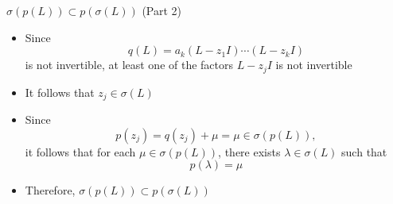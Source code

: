 \documentclass[usenames,dvipsnames,10pt]{beamer}
\begin{document}
\begin{frame}
  {$\sigma(p(L)) \subset p(\sigma(L))$ (Part 2)}

  \begin{itemize}
  \item Since
    \[
      q(L) = a_k(L-z_1I)\cdots(L-z_kI)
    \]
    is not invertible, at least one of the factors $L-z_jI$ is not invertible
  \item It follows that $z_j \in \sigma(L)$
  \item Since
    \[
      p(z_j) = q(z_j)+\mu = \mu \in \sigma(p(L)),
    \]
    it follows that for each $\mu \in \sigma(p(L))$, there exists $\lambda \in \sigma(L)$ such that
    \[
      p(\lambda) = \mu
    \]
  \item Therefore, $\sigma(p(L)) \subset p(\sigma(L))$
  \end{itemize}
\end{frame}
\end{document}
